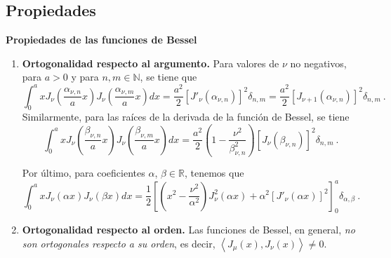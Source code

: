 \subsection{Propiedades}
\begin{propiedad}
    \textbf{Propiedades de las funciones de Bessel}

    \begin{enumerate}
        \item \textbf{Ortogonalidad respecto al argumento.} Para valores de $\nu$ no negativos, para $a > 0$ y para $n, m \in \mathbb{N}$, se tiene que
        \begin{equation}
            \int_0^a x J_{\nu} \left( \frac{\alpha_{\nu, n}}{a} x \right) J_\nu\left( \frac{\alpha_{\nu, m}}{a} x \right) dx = \frac{a^2}{2} [J'_\nu(\alpha_{\nu, n})]^2 \delta_{n, m} = \frac{a^2}{2} [J_{\nu+1}(\alpha_{\nu, n})]^2 \delta_{n, m} \ .
        \end{equation}
        Similarmente, para las raíces de la derivada de la función de Bessel, se tiene
        \begin{equation}
            \int_0^a x J_\nu\left(\frac{\beta_{\nu, n}}{a}x \right) J_\nu\left(\frac{\beta_{\nu, m}}{a}x \right) dx = \frac{a^2}{2} \left( 1 - \frac{\nu^2}{\beta^2_{\nu, n}} \right) \left[ J_\nu(\beta_{\nu, n}) \right]^2 \delta_{n, m} \ .
        \end{equation}

        Por último, para coeficientes $\alpha$, $\beta \in \mathbb{R}$, tenemos que
        \begin{equation*}
            \int_0^a x J_\nu(\alpha x) J_\nu (\beta x) dx = \frac{1}{2} \left[ \left( x^2 - \frac{\nu^2}{\alpha^2} \right) J^2_\nu(\alpha x) + \alpha^2 [J'_\nu(\alpha x)]^2 \right]_0^a \delta_{\alpha, \beta} \ .
        \end{equation*}


        \item \textbf{Ortogonalidad respecto al orden.} Las funciones de Bessel, en general, \emph{no son ortogonales respecto a su orden}, es decir, $\left\langle J_\mu(x), J_\nu(x) \right\rangle \neq 0$.
        

\end{enumerate}
\end{propiedad}
